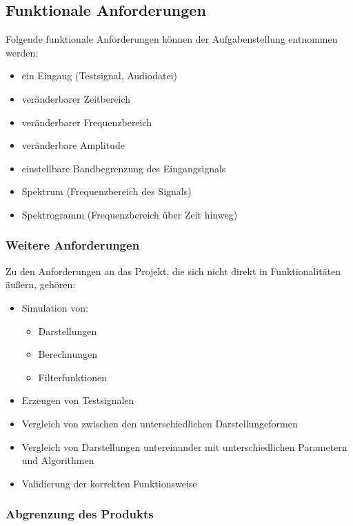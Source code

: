 \documentclass[a4paper]{article}
\begin{document}
\subsection{Funktionale Anforderungen}\label{subsec:funktionaleAnforderungen}

Folgende funktionale Anforderungen können der Aufgabenstellung entnommen werden:
\begin{itemize}
  \item ein Eingang (Testsignal, Audiodatei)
  \item veränderbarer Zeitbereich
  \item veränderbarer Frequenzbereich
  \item veränderbare Amplitude
  \item einstellbare Bandbegrenzung des Eingangsignals
  \item Spektrum (Frequenzbereich des Signals)
  \item Spektrogramm (Frequenzbereich über Zeit hinweg)
\end{itemize}

\subsubsection{Weitere Anforderungen}

Zu den Anforderungen an das Projekt, die sich nicht direkt in Funktionalitäten äußern, gehören:
\begin{itemize}
  \item Simulation von:
  \begin{itemize}
    \item Darstellungen
    \item Berechnungen
    \item Filterfunktionen
  \end{itemize}
  \item Erzeugen von Testsignalen
  \item Vergleich von zwischen den unterschiedlichen Darstellungeformen
  \item Vergleich von Darstellungen untereinander mit unterschiedlichen Parametern und Algorithmen
  \item Validierung der korrekten Funktionsweise
\end{itemize}

\subsubsection{Abgrenzung des Produkts}
\end{document}
